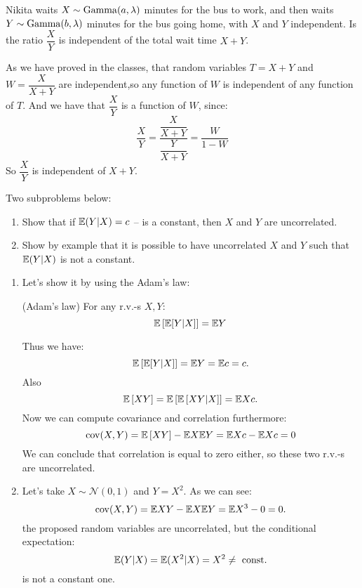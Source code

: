 \documentclass[12pt]{report}
\begin{document}
\begin{problem}{}
    Nikita waits $X \sim \operatorname{Gamma} (a, \lambda)$ minutes for the bus to work, and then waits $Y \sim \operatorname{Gamma} (b, \lambda)$ minutes for the bus going home, with $X$ and $Y$ independent. Is the ratio $\dfrac{X}{Y}$ is independent of the total wait time $X + Y$.
\end{problem}

\begin{solution}
    As we have proved in the classes, that random variables $T = X+Y$ and $W = \dfrac{X}{X+Y}$ are independent,so any function of $W$ is independent of any function of $T$. And we have that $\dfrac{X}{Y}$ is a function of $W$, since:
    \[
        \dfrac{X}{Y} = \dfrac{\dfrac{X}{X+Y}}{\dfrac{Y}{X+Y}} = \dfrac{W}{1-W}  
    \]
    So $\dfrac{X}{Y}$ is independent of $X+Y$.
\end{solution}

\begin{problem}{Two subproblems below:}
    \begin{enumerate}
        \item Show that if $\mathbb{E}(Y|X) = c$ -- is a constant, then $X $ and $Y$ are uncorrelated. 
        \item Show by example that it is possible to have uncorrelated $X$ and $Y$ such that $\mathbb{E}(Y|X)$ is not a constant.
    \end{enumerate}
\end{problem}

\begin{solution}
    \begin{enumerate}
        \item Let's show it by using the Adam's law:
        \begin{theorema}{(Adam's law)}{}
            For any r.v.-s $X, Y$:
            \[
            \mathbb{E}\left[\mathbb{E}[Y|X]\right] = \mathbb{E} Y
            \]
        \end{theorema}
        Thus we have:
        \[
            \mathbb{E}\left[\mathbb{E}[Y|X]\right] = \mathbb{E} Y = \mathbb{E} c = c.
        \]
        Also
        \[
            \mathbb{E}\left[XY\right] = \mathbb{E}\left[\mathbb{E}\left[XY|X\right]\right] = \mathbb{E} Xc.  
        \]
        Now we can compute covariance and correlation furthermore:
        \[
            \operatorname{cov} (X, Y) = \mathbb{E} \left[XY\right] - \mathbb{E} X \mathbb{E} Y = \mathbb{E} X c - \mathbb{E} X c = 0  
        \]
        We can conclude that correlation is equal to zero either, so these two r.v.-s are uncorrelated.
        \item Let's take $X \sim \mathcal{N}(0,1)$ and $Y = X^2$. As we can see:
        \[
            \operatorname{cov} (X, Y) = \mathbb{E} XY - \mathbb{E} X \mathbb{E} Y = \mathbb{E} X^3 - 0 = 0.  
        \]
        the proposed random variables are uncorrelated, but the conditional expectation:
        \[
            \mathbb{E} (Y | X) = \mathbb{E} (X^2 | X) = X^2 \neq \text{ const}.
        \]
        is not a constant one.
    \end{enumerate}
\end{solution}
\end{document}
